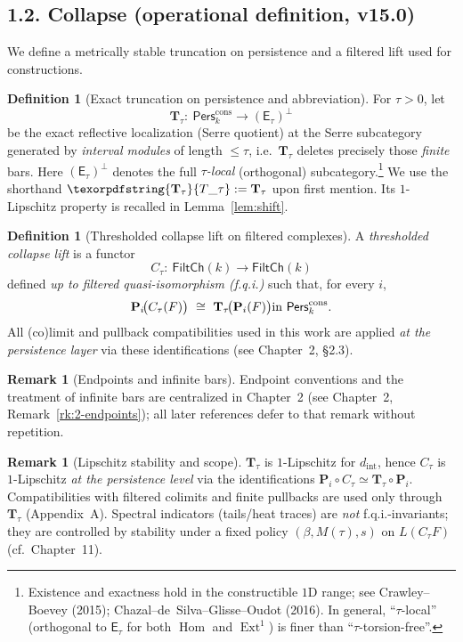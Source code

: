 \documentclass[11pt]{article}
\DeclareMathOperator{\Ext}{Ext}
\DeclareMathOperator{\Hom}{Hom}
\newcommand{\Pers}{\mathsf{Pers}}
\numberwithin{equation}{section}
\theoremstyle{definition}
\newtheorem{definition}[theorem]{Definition}
\newtheorem{remark}[theorem]{Remark}
\DeclareRobustCommand{\Ttau}{\texorpdfstring{\ensuremath{\mathbf{T}_{\tau}}}{T\_\tau}}
\providecommand{\n}{\unskip\space}
\begin{document}
\subsection*{1.2. Collapse (operational definition, v15.0)}
We define a metrically stable truncation on persistence and a filtered lift used for constructions.

\begin{definition}[Exact truncation on persistence and abbreviation]\label{def:Ttau}
For $\tau>0$, let
\[
\mathbf{T}_\tau:\ \Pers^{\mathrm{cons}}_k\longrightarrow (\mathsf{E}_\tau)^{\perp}
\]
be the exact reflective localization (Serre quotient) at the Serre subcategory generated by \emph{interval modules} of length $\le \tau$, i.e.\ $\mathbf{T}_\tau$ deletes precisely those \emph{finite} bars. Here $(\mathsf{E}_\tau)^{\perp}$ denotes the full \emph{$\tau$-local} (orthogonal) subcategory.\footnote{Existence and exactness hold in the constructible $1$D range; see Crawley--Boevey (2015); Chazal--de~Silva--Glisse--Oudot (2016). In general, ``$\tau$-local'' (orthogonal to $\mathsf{E}_\tau$ for both $\Hom$ and $\Ext^1$) is finer than ``$\tau$-torsion-free''.}
We use the shorthand $\Ttau:=\mathbf{T}_\tau$ upon first mention. Its $1$-Lipschitz property is recalled in Lemma~\ref{lem:shift}.
\end{definition}

\begin{definition}[Thresholded collapse lift on filtered complexes]\label{def:Ctau}
A \emph{thresholded collapse lift} is a functor
\[
C_\tau:\ \mathsf{FiltCh}(k)\longrightarrow \mathsf{FiltCh}(k)
\]
defined \emph{up to filtered quasi-isomorphism (f.q.i.)} such that, for every $i$,
\[
\mathbf{P}_i\!\big(C_\tau(F)\big)\ \cong\ \mathbf{T}_\tau\!\big(\mathbf{P}_i(F)\big)\quad\n\text{in }\Pers^{\mathrm{cons}}_k.
\]
All (co)limit and pullback compatibilities used in this work are applied \emph{at the persistence layer} via these identifications (see Chapter~2, §2.3).
\end{definition}

\begin{remark}[Endpoints and infinite bars]\label{rem:endpoints-infinite-bars}
Endpoint conventions and the treatment of infinite bars are centralized in Chapter~2 (see Chapter~2, Remark~\ref{rk:2-endpoints}); all later references defer to that remark without repetition.
\end{remark}

\begin{remark}[Lipschitz stability and scope]\label{rk:Ctau-stability}
$\mathbf{T}_\tau$ is $1$-Lipschitz for $d_{\mathrm{int}}$, hence $C_\tau$ is $1$-Lipschitz \emph{at the persistence level} via the identifications $\mathbf{P}_i\!\circ C_\tau\simeq \mathbf{T}_\tau\!\circ \mathbf{P}_i$. Compatibilities with filtered colimits and finite pullbacks are used only through $\mathbf{T}_\tau$ (Appendix~A). Spectral indicators (tails/heat traces) are \emph{not} f.q.i.-invariants; they are controlled by stability under a fixed policy $(\beta,M(\tau),s)$ on $L(C_\tau F)$ (cf.\ Chapter~11).
\end{remark}
\end{document}

